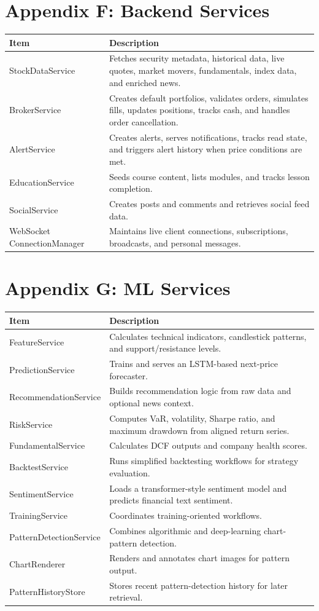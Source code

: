 \documentclass[11pt,a4paper]{article}
\begin{document}
\section*{Appendix F: Backend Services}
\begin{longtable}{p{} p{}}
\textbf{Item} & \textbf{Description} \\ \hline
StockDataService & Fetches security metadata, historical data, live quotes, market movers, fundamentals, index data, and enriched news. \\
BrokerService & Creates default portfolios, validates orders, simulates fills, updates positions, tracks cash, and handles order cancellation. \\
AlertService & Creates alerts, serves notifications, tracks read state, and triggers alert history when price conditions are met. \\
EducationService & Seeds course content, lists modules, and tracks lesson completion. \\
SocialService & Creates posts and comments and retrieves social feed data. \\
WebSocket ConnectionManager & Maintains live client connections, subscriptions, broadcasts, and personal messages. \\
\end{longtable}
\section*{Appendix G: ML Services}
\begin{longtable}{p{} p{}}
\textbf{Item} & \textbf{Description} \\ \hline
FeatureService & Calculates technical indicators, candlestick patterns, and support/resistance levels. \\
PredictionService & Trains and serves an LSTM-based next-price forecaster. \\
RecommendationService & Builds recommendation logic from raw data and optional news context. \\
RiskService & Computes VaR, volatility, Sharpe ratio, and maximum drawdown from aligned return series. \\
FundamentalService & Calculates DCF outputs and company health scores. \\
BacktestService & Runs simplified backtesting workflows for strategy evaluation. \\
SentimentService & Loads a transformer-style sentiment model and predicts financial text sentiment. \\
TrainingService & Coordinates training-oriented workflows. \\
PatternDetectionService & Combines algorithmic and deep-learning chart-pattern detection. \\
ChartRenderer & Renders and annotates chart images for pattern output. \\
PatternHistoryStore & Stores recent pattern-detection history for later retrieval. \\
\end{longtable}
\end{document}
